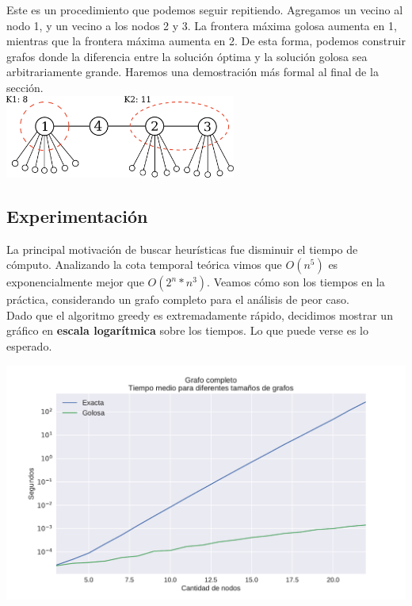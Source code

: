 Este es un procedimiento que podemos seguir repitiendo. Agregamos un vecino al nodo 1, y un vecino a los nodos 2 y 3. La frontera máxima golosa aumenta en 1, mientras que la frontera máxima aumenta en 2. De esta forma, podemos construir grafos donde la diferencia entre la solución óptima y la solución golosa sea arbitrariamente grande. Haremos una demostración más formal al final de la sección.\\

{\centering
    \includegraphics[width=0.57\textwidth]{informe/imgs/greedy_base_nodes_v2.png} \\
}

\subsection{Experimentación}


La principal motivación de buscar heurísticas fue disminuir el tiempo de cómputo. Analizando la cota temporal teórica vimos que $O(n^5)$ es exponencialmente mejor que $O(2^{n} * n^{3})$. Veamos cómo son los tiempos en la práctica, considerando un grafo completo para el análisis de peor caso. \\

Dado que el algoritmo greedy es extremadamente rápido, decidimos mostrar un gráfico en \textbf{escala logarítmica} sobre los tiempos. Lo que puede verse es lo esperado.

{\centering
    \includegraphics[width=1\textwidth]{informe/imgs/exp_completo_tiempo_greedy_exacta_logy.pdf} \\
}

